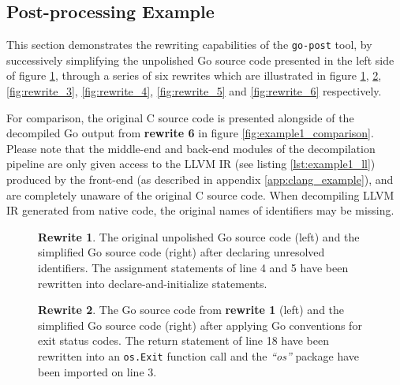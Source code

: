 
\subsection{Post-processing Example}
\label{app:post-processing_example}

This section demonstrates the rewriting capabilities of the \texttt{go-post} tool, by successively simplifying the unpolished Go source code presented in the left side of figure \ref{fig:rewrite_1}, through a series of six rewrites which are illustrated in figure \ref{fig:rewrite_1}, \ref{fig:rewrite_2}, \ref{fig:rewrite_3}, \ref{fig:rewrite_4}, \ref{fig:rewrite_5} and \ref{fig:rewrite_6} respectively.

For comparison, the original C source code is presented alongside of the decompiled Go output from \textbf{rewrite 6} in figure \ref{fig:example1_comparison}. Please note that the middle-end and back-end modules of the decompilation pipeline are only given access to the LLVM IR (see listing \ref{lst:example1_ll}) produced by the front-end (as described in appendix \ref{app:clang_example}), and are completely unaware of the original C source code. When decompiling LLVM IR generated from native code, the original names of identifiers may be missing.

\begin{figure}[htbp]
	\centering
	\begin{subfigure}[t]{0.45\textwidth}
		
	\end{subfigure}
	\qquad
	\begin{subfigure}[t]{0.45\textwidth}
		
	\end{subfigure}
	\caption{\textbf{Rewrite 1}. The original unpolished Go source code (left) and the simplified Go source code (right) after declaring unresolved identifiers. The assignment statements of line 4 and 5 have been rewritten into declare-and-initialize statements.}
	\label{fig:rewrite_1}
\end{figure}

\begin{figure}[htbp]
	\centering
	\begin{subfigure}[t]{0.45\textwidth}
		
	\end{subfigure}
	\qquad
	\begin{subfigure}[t]{0.45\textwidth}
		
	\end{subfigure}
	\caption{\textbf{Rewrite 2}. The Go source code from \textbf{rewrite 1} (left) and the simplified Go source code (right) after applying Go conventions for exit status codes. The return statement of line 18 have been rewritten into an \texttt{os.Exit} function call and the \textit{``os''} package have been imported on line 3.}
	\label{fig:rewrite_2}
\end{figure}

